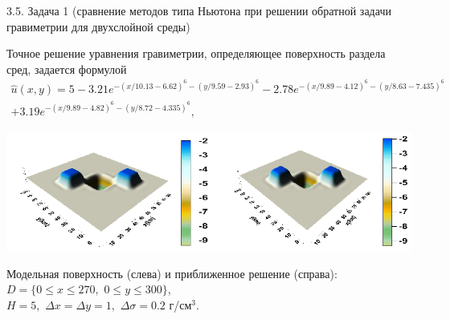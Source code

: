 \documentclass[10pt,pdf, mathserif, hyperref={unicode}]{beamer}
\begin{document}
\begin{frame}{\small 3.5. Задача 1 (сравнение методов типа Ньютона при решении обратной задачи гравиметрии для двухслойной среды)}
	
	Точное решение уравнения гравиметрии, определяющее поверхность раздела сред, задается формулой
	\begin{equation*}
	\begin{aligned}
	\hat{u}(x,y)=5-3.21e^{-(x/10.13-6.62)^6-(y/9.59-2.93)^6}-2.78e^{-(x/9.89-4.12)^6-(y/8.63-7.435)^6}\\+3.19e^{-(x/9.89-4.82)^6-(y/8.72-4.335)^6},
	\end{aligned} 
	\end{equation*}
	\centering
		
	\includegraphics[width=\textwidth, height=0.35\textheight]{gravy_kiev2014.png}
	
	Модельная поверхность (слева) и приближенное решение (справа): $D=\{0\leqslant x\leqslant 270, \,\,0\leqslant y\leqslant 300\}$, \\ $  H=5,\,\,\Delta x=\Delta y=1,\,\,\Delta\sigma=0.2$ г/см$^3$.
\end{frame}
\end{document}
